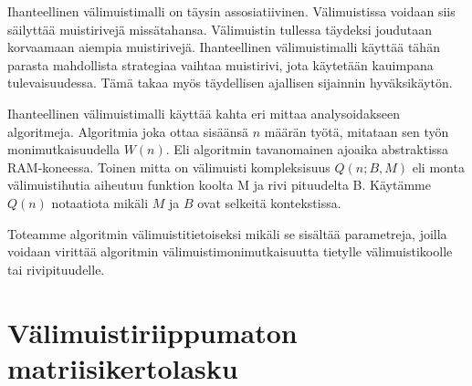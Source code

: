\documentclass[finnish]{tktltiki2}
\theoremstyle{definition}
\theoremstyle{remark}
\begin{document}
Ihanteellinen välimuistimalli on täysin assosiatiivinen.
Välimuistissa voidaan siis säilyttää muistirivejä missätahansa.
Välimuistin tullessa täydeksi joudutaan korvaamaan aiempia muistirivejä.
Ihanteellinen välimuistimalli käyttää tähän parasta mahdollista strategiaa
vaihtaa muistirivi, jota käytetään kauimpana tulevaisuudessa. %
Tämä takaa myös täydellisen ajallisen sijainnin hyväksikäytön.

Ihanteellinen välimuistimalli käyttää kahta eri mittaa analysoidakseen algoritmeja.
Algoritmia joka ottaa sisäänsä $n$ määrän työtä, mitataan sen työn monimutkaisuudella $W(n)$.
Eli algoritmin tavanomainen ajoaika abstraktissa RAM-koneessa.
Toinen mitta on välimuisti kompleksisuus $Q(n;B,M)$ eli monta välimuistihutia aiheutuu funktion koolta M ja rivi pituudelta B.
Käytämme $Q(n)$ notaatiota mikäli $M$ ja $B$ ovat selkeitä kontekstissa.

Toteamme algoritmin välimuistitietoiseksi mikäli se sisältää parametreja, joilla voidaan
virittää algoritmin välimuistimonimutkaisuutta tietylle välimuistikoolle tai rivipituudelle.

















\section{Välimuistiriippumaton matriisikertolasku}

%
%
% 
%



\end{document}
